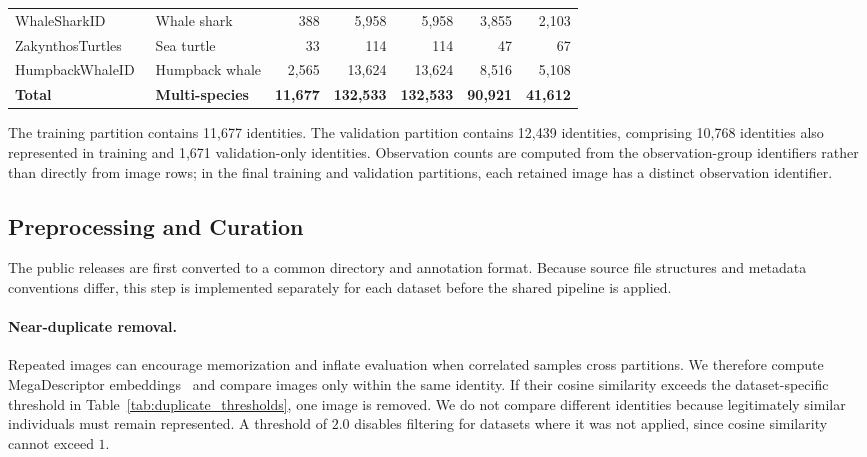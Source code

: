 \begin{table}[t]
{\begin{tabular}{l l r r r r r}
WhaleSharkID~\cite{holmberg2009estimating} & Whale shark & 388 & 5,958 & 5,958 & 3,855 & 2,103 \\
ZakynthosTurtles~\cite{adam2025exploiting} & Sea turtle & 33 & 114 & 114 & 47 & 67 \\
HumpbackWhaleID~\cite{vcermak2024wildlifedatasets} & Humpback whale & 2,565 & 13,624 & 13,624 & 8,516 & 5,108 \\
\midrule
\textbf{Total} & \textbf{Multi-species} & \textbf{11,677} &
\textbf{132,533} & \textbf{132,533} & \textbf{90,921} &
\textbf{41,612} \\
\bottomrule
\end{tabular}%
}
\end{table}

The training partition contains 11,677 identities. The validation partition
contains 12,439 identities, comprising 10,768 identities also represented in
training and 1,671 validation-only identities. Observation counts are computed
from the observation-group identifiers rather than directly from image rows;
in the final training and validation partitions, each retained image has a
distinct observation identifier.

\subsection{Preprocessing and Curation}
\label{sec:dataset:curation}

The public releases are first converted to a common directory and annotation
format. Because source file structures and metadata conventions differ, this
step is implemented separately for each dataset before the shared pipeline is
applied.

\paragraph{Near-duplicate removal.}
\label{sec:dataset:duplicates}
Repeated images can encourage memorization and inflate evaluation when
correlated samples cross partitions. We therefore compute MegaDescriptor
embeddings~\cite{vcermak2024wildlifedatasets} and compare images only within
the same identity. If their cosine similarity exceeds the dataset-specific
threshold in Table~\ref{tab:duplicate_thresholds}, one image is removed. We do
not compare different identities because legitimately similar individuals
must remain represented. A threshold of $2.0$ disables filtering for datasets
where it was not applied, since cosine similarity cannot exceed $1$.


